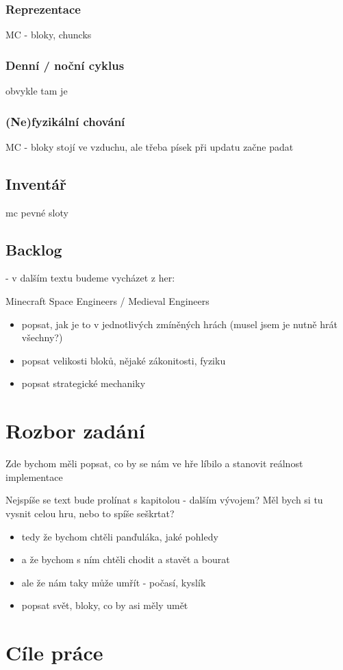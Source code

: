 \subsubsection{Reprezentace}

MC - bloky, chuncks

\subsubsection{Denní / noční cyklus}

obvykle tam je

\subsubsection{(Ne)fyzikální chování}

MC - bloky stojí ve vzduchu, ale třeba písek při updatu začne padat

\subsection{Inventář}

mc pevné sloty


\subsection{Backlog}

- v dalším textu budeme vycházet z her:

Minecraft 
Space Engineers / Medieval Engineers 

\begin{itemize}
	\item popsat, jak je to v jednotlivých zmíněných hrách (musel jsem je nutně hrát všechny?)
	\item popsat velikosti bloků, nějaké zákonitosti, fyziku
	\item popsat strategické mechaniky
\end{itemize}

\section{Rozbor zadání}

Zde bychom měli popsat, co by se nám ve hře líbilo a stanovit reálnost implementace


Nejspíše se text bude prolínat s kapitolou - dalším vývojem?
Měl bych si tu vysnit celou hru, nebo to spíše seškrtat?


\begin{itemize}
	\item tedy že bychom chtěli panďuláka, jaké pohledy
	\item a že bychom s ním chtěli chodit a stavět a bourat
	\item ale že nám taky může umřít - počasí, kyslík
	\item popsat svět, bloky, co by asi měly umět

\end{itemize}


\section{Cíle práce}
